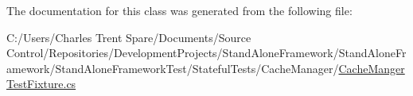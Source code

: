The documentation for this class was generated from the following file\+:\begin{DoxyCompactItemize}
\item 
C\+:/\+Users/\+Charles Trent Spare/\+Documents/\+Source Control/\+Repositories/\+Development\+Projects/\+Stand\+Alone\+Framework/\+Stand\+Alone\+Framework/\+Stand\+Alone\+Framework\+Test/\+Stateful\+Tests/\+Cache\+Manager/\hyperlink{_cache_manger_test_fixture_8cs}{Cache\+Manger\+Test\+Fixture.\+cs}\end{DoxyCompactItemize}
